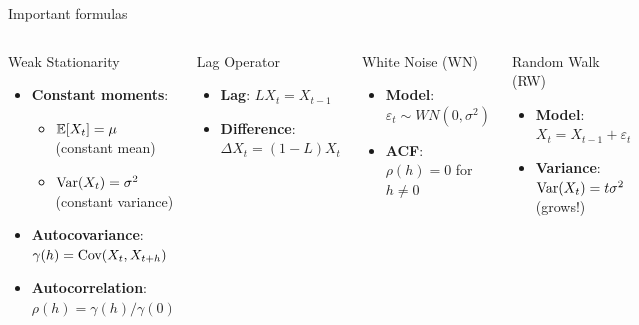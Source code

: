 \documentclass[9pt, aspectratio=169, t]{beamer}
\begin{document}
\begin{frame}{Important formulas}
    \begin{columns}[T]
        {\small
        \begin{block}{Weak Stationarity}
            \begin{itemize}\setlength{\itemsep}{0pt}
                \item \textbf{Constant moments}:
                \begin{itemize}
                    \item $\mathbb{E}[X_t] = \mu$ (constant mean)
                    \item $\text{Var}(X_t) = \sigma^2$ (constant variance)
                \end{itemize}
                \item \textbf{Autocovariance}: $\gamma(h) = \text{Cov}(X_t, X_{t+h})$
                \item \textbf{Autocorrelation}: $\rho(h) = \gamma(h)/\gamma(0)$
            \end{itemize}
        \end{block}

        \begin{block}{Lag Operator}
            \begin{itemize}\setlength{\itemsep}{0pt}
                \item \textbf{Lag}: $LX_t = X_{t-1}$
                \item \textbf{Difference}: $\Delta X_t = (1-L)X_t$
            \end{itemize}
        \end{block}
        }

        {\small
        \begin{exampleblock}{White Noise (WN)}
            \begin{itemize}\setlength{\itemsep}{0pt}
                \item \textbf{Model}: $\varepsilon_t \sim WN(0, \sigma^2)$
                \item \textbf{ACF}: $\rho(h) = 0$ for $h \neq 0$
            \end{itemize}
        \end{exampleblock}

        \begin{alertblock}{Random Walk (RW)}
            \begin{itemize}\setlength{\itemsep}{0pt}
                \item \textbf{Model}: $X_t = X_{t-1} + \varepsilon_t$
                \item \textbf{Variance}: $\text{Var}(X_t) = t\sigma^2$ (grows!)
            \end{itemize}
        \end{alertblock}
        }
    \end{columns}
\end{frame}
\end{document}
